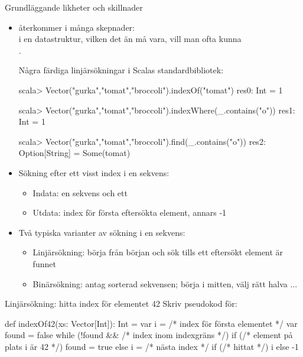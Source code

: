 

\ifkompendium\else

\begin{Slide}{Grundläggande likheter och skillnader}\SlideFontSmall

\begin{itemize}
\item {} återkommer i många skepnader: \\ i en datastruktur, vilken det än må vara, vill man ofta kunna \\ . 

\pause
Några färdiga linjärsökningar i Scalas standardbibliotek:

\begin{REPL}
scala> Vector("gurka","tomat","broccoli").indexOf("tomat")
res0: Int = 1

scala> Vector("gurka","tomat","broccoli").indexWhere(_.contains("o"))
res1: Int = 1

scala> Vector("gurka","tomat","broccoli").find(_.contains("o"))
res2: Option[String] = Some(tomat)
\end{REPL}

\pause
\item Sökning efter ett visst index i en sekvens:

\begin{itemize}\SlideFontTiny
\item Indata: en sekvens och ett 
\item Utdata: index för första eftersökta element, annars -1 
\end{itemize}

\pause
\item Två typiska varianter av sökning i en sekvens:
\begin{itemize}\SlideFontTiny
\item Linjärsökning: börja från början och sök tills ett eftersökt element är funnet
\item Binärsökning: antag sorterad sekvensen; börja i mitten, välj rätt halva ...
\end{itemize}
\end{itemize}
\end{Slide}


\begin{Slide}{Linjärsökning: hitta index för elementet 42}
Skriv pseudokod för:\\ 
\pause
\begin{Code}
def indexOf42(xs: Vector[Int]): Int = {
  var i = /* index för första elementet */
  var found = false
  while (!found && /* index inom indexgräns */) {
    if (/* element på plats i är 42 */) found = true 
    else i = /* nästa index */
  }
  if (/* hittat */) i else -1
} 
\end{Code}
\end{Slide}

